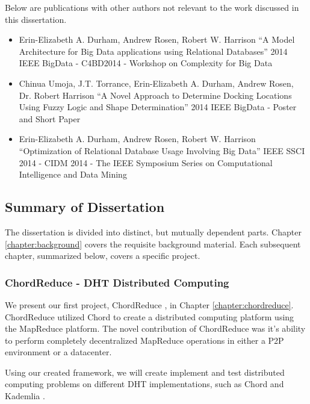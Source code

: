 Below are publications with other authors not relevant to the work discussed in this dissertation.
\begin{itemize}
	\item  Erin-Elizabeth A. Durham, Andrew Rosen, Robert W. Harrison
	``A Model Architecture for Big Data applications using Relational Databases''
	2014 IEEE BigData - C4BD2014 - Workshop on Complexity for Big Data  \cite{durham2014model}
	\item Chinua Umoja, J.T. Torrance, Erin-Elizabeth A. Durham, Andrew Rosen, Dr. Robert Harrison
	``A Novel Approach to Determine Docking Locations Using Fuzzy Logic and Shape Determination''
	2014 IEEE BigData - Poster and Short Paper \cite{umoja2014novel}
	\item  Erin-Elizabeth A. Durham, Andrew Rosen, Robert W. Harrison
	``Optimization of Relational Database Usage Involving Big Data'' 
	IEEE SSCI 2014 - CIDM 2014 - The IEEE Symposium Series on Computational Intelligence and Data Mining \cite{durham2014optimization}
\end{itemize}



\subsection{Summary of Dissertation}


The dissertation is divided into distinct, but mutually dependent parts.
Chapter \ref{chapter:background} covers the requisite background material.
Each subsequent chapter, summarized below, covers a specific project.



\subsubsection{ChordReduce - DHT Distributed Computing}
We present our first project, ChordReduce \cite{chordreduce}, in Chapter \ref{chapter:chordreduce}.
ChordReduce utilized Chord \cite{chord} to create a distributed computing platform using the MapReduce \cite{mapreduce} platform.
The novel contribution of ChordReduce was it's ability to perform completely decentralized MapReduce operations in either a P2P environment or a datacenter.

Using our created framework, we will create implement and test distributed computing problems on different DHT implementations, such as Chord \cite{chord} and Kademlia \cite{kademlia}.



